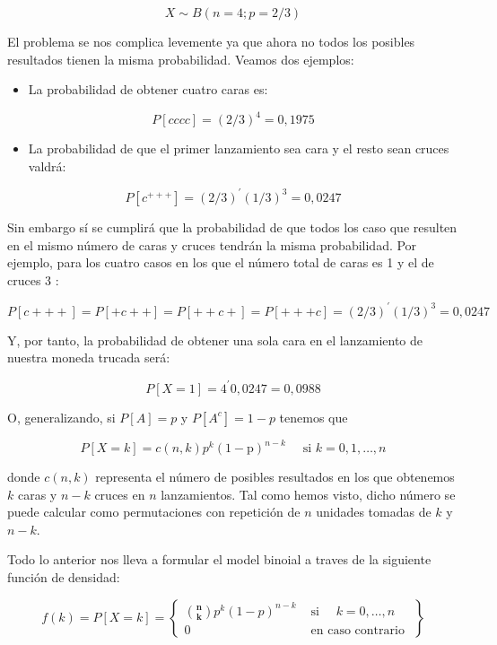\documentclass[
]{article}
\providecommand{\tightlist}{%
  \setlength{\itemsep}{0pt}\setlength{\parskip}{0pt}}
\begin{document}
\[
X \sim B(n=4 ; p=2 / 3)
\]

El problema se nos complica levemente ya que ahora no todos los posibles resultados tienen la misma probabilidad. Veamos dos ejemplos:

\begin{itemize}
\tightlist
\item
  La probabilidad de obtener cuatro caras es:
\end{itemize}

\[
P[c c c c]=(2 / 3)^{4}=0,1975
\]

\begin{itemize}
\tightlist
\item
  La probabilidad de que el primer lanzamiento sea cara y el resto sean cruces valdrá:
\end{itemize}

\[
P\left[c^{+++}\right]=(2 / 3)^{\prime}(1 / 3)^{3}=0,0247
\]

Sin embargo sí se cumplirá que la probabilidad de que todos los caso que resulten en el mismo número de caras y cruces tendrán la misma probabilidad. Por ejemplo, para los cuatro casos en los que el número total de caras es 1 y el de cruces 3 :

\[
P[c+++]=P[+c++]=P[++c+]=P[+++c]=(2 / 3)^{\prime}(1 / 3)^{3}=0,0247
\]

Y, por tanto, la probabilidad de obtener una sola cara en el lanzamiento de nuestra moneda trucada será:

\[
P[X=1]=4^{\prime} 0,0247=0,0988
\]

O, generalizando, si \(P[A]=p\) y \(P\left[A^{c}\right]=1-p\) tenemos que

\[
P[X=k]=c(n, k) p^{k}(1-\mathrm{p})^{n-k} \quad \text { si } k=0,1, \ldots, n
\]

donde \(c(n, k)\) representa el número de posibles resultados en los que obtenemos \(k\) caras y \(n-k\) cruces en \(n\) lanzamientos. Tal como hemos visto, dicho número se puede calcular como permutaciones con repetición de \(n\) unidades tomadas de \(k\) y \(n-k\).

Todo lo anterior nos lleva a formular el model binoial a traves de la siguiente función de densidad:

\[
f(k)=P[X=k]=\left\{\begin{array}{ll}
\binom{\mathbf{n}}{\mathbf{k}} p^{k}(1-p)^{n-k} & \text { si } \quad k=0, \ldots, n \\
0 & \text { en caso contrario }
\end{array}\right\}
\]
\end{document}
